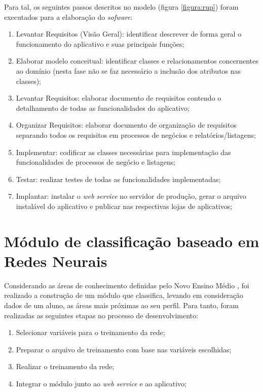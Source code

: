 Para tal, os seguintes passos descritos no modelo (figura \ref{figura:rup}) foram executados para a elaboração do \textit{sofware}:

\begin{enumerate}
   \item Levantar Requisitos (Visão Geral): identificar descrever de forma geral o funcionamento do aplicativo e suas principais funções;
   \item Elaborar modelo conceitual: identificar classes e relacionamentos concernentes ao domínio (nesta fase não se faz necessário a inclusão dos atributos nas classes);
   \item Levantar Requisitos: elaborar documento de requisitos contendo o detalhamento de todas as funcionalidades do aplicativo;
   \item Organizar Requisitos: elaborar documento de organização de requisitos separando todos os requisitos em processos de negócios e relatórios/listagens;
   \item Implementar: codificar as classes necessárias para implementação das funcionalidades de processos de negócio e listagens;
   \item Testar: realizar testes de todas as funcionalidades implementadas;
   \item Implantar: instalar o \textit{web service} no servidor de produção, gerar o arquivo instalável do aplicativo e publicar nas respectivas lojas de aplicativos;
\end{enumerate}

\section{Módulo de classificação baseado em Redes Neurais}

Considerando as áreas de conhecimento definidas pelo Novo Ensino Médio \cite{lei13415}, foi realizado a construção de um módulo que classifica, levando em consideração dados de um aluno, as áreas mais próximas ao seu perfil. Para tanto, foram realizadas as seguintes etapas no processo de desenvolvimento:

\begin{enumerate}
   \item Selecionar variáveis para o treinamento da rede;
   \item Preparar o arquivo de treinamento com base nas variáveis escolhidas;
   \item Realizar o treinamento da rede;
   \item Integrar o módulo junto ao \textit{web service} e ao aplicativo;
\end{enumerate}

